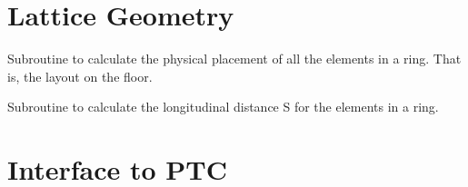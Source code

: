 \section{Lattice Geometry}
\label{r:geom}     

\begin{description}

\item[ring\_geometry (ring)] \Newline
Subroutine to calculate the physical placement of all the elements in a ring. 
That is, the layout on the floor. 

\item[s\_calc (ring)] \Newline
Subroutine to calculate the longitudinal distance S for the elements in a ring. 

\end{description}

\section{Interface to PTC}
\label{r:ptc}      

